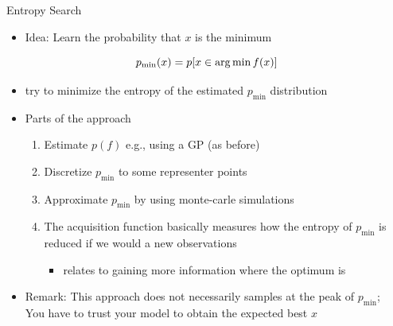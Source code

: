 \begin{frame}[c,fragile]{Entropy Search~}

\begin{itemize}
	\item Idea: Learn the probability that $x$ is the minimum
\end{itemize}

$$
p_{\text{min}}(x) = p[x \in \operatorname*{arg\,min} f(x)]
$$

\begin{itemize}
	\item try to minimize the entropy of the estimated $p_\text{min}$ distribution
	\item Parts of the approach
	\begin{enumerate}
		\item Estimate $p(f)$ e.g., using a GP (as before)
		\item Discretize $p_\text{min}$ to some representer points
		\item Approximate $p_\text{min}$ by using monte-carle simulations
		\item The acquisition function basically measures how the entropy of $p_\text{min}$ is reduced if we would a new observations
		\begin{itemize}
			\item relates to gaining more information where the optimum is
		\end{itemize}
	\end{enumerate}
	\pause
	\item Remark: This approach does not necessarily samples at the peak of $p_\text{min}$;\\
	You have to trust your model to obtain the expected best $x$ 
\end{itemize}

\end{frame}
